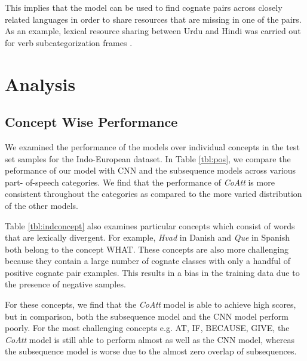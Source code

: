 \documentclass[11pt,letterpaper]{article}
\begin{document}
This implies that the model can be used to find cognate pairs across closely related languages in order to share resources that are missing in one of the pairs. As an example, lexical resource sharing between Urdu and Hindi was carried out for verb subcategorization frames \cite{bhat-EtAl:2014:LT4CloseLang}.

\section{Analysis}

\subsection{Concept Wise Performance}

We examined the performance of the models over individual concepts in the test set samples for the Indo-European dataset. In Table \ref{tbl:pos}, we compare the peformance of our model with CNN and the subsequence models across various part- of-speech categories. We find that the performance of \textit{CoAtt} is more consistent throughout the categories as compared to the more varied distribution of the other models. 

Table \ref{tbl:indconcept} also examines particular concepts which consist of words that are lexically divergent. For example, \textit{Hvad} in Danish and \textit{Que} in Spanish both belong to the concept WHAT. These concepts are also more challenging because they contain a large number of cognate classes with only a handful of positive cognate pair examples. This results in a bias in the training data due to the presence of negative samples. 

For these concepts, we find that the \textit{CoAtt} model is able to achieve high scores, but in comparison, both the subsequence model and the CNN model perform poorly. For the most challenging concepts e.g. AT, IF, BECAUSE, GIVE, the \textit{CoAtt} model is still able to perform almost as well as the CNN model, whereas the subsequence model is worse due to the almost zero overlap of subsequences.
\end{document}
